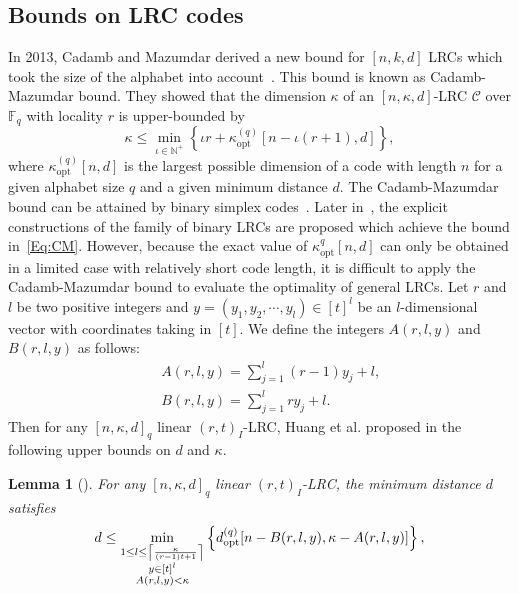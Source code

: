 \documentclass[10pt]{article}
\newtheorem{lemma}{Lemma}
\newcommand{\0}{\textbf{0}}
\newcommand{\1}{\textbf{1}}
\begin{document}
{\color{red}
\subsection{Bounds on LRC codes}

 In 2013,  Cadamb and Mazumdar derived a new bound for $[n,k,d]$ LRCs which took the size of the alphabet into
 account~\cite{Viveck2013}. This bound is known as Cadamb-Mazumdar bound. They showed that the dimension $\kappa$ of
 an $[n, \kappa, d]$-LRC $\mathcal{C}$ over $\mathbb{F}_{q}$ with locality $r$ is upper-bounded by
\begin{equation}\label{Eq:CM}
 \kappa \leq \min _{\iota \in \mathbb{N}^{+}}\left\{\iota r+\kappa_{\text {opt }}^{(q)}[n-\iota(r+1), d]\right\},
\end{equation}
where $\kappa_{\text {opt }}^{(q)}[n, d]$ is the largest possible dimension of a code with length $n$ for a given alphabet size $q$
and a given minimum distance $d$.
The Cadamb-Mazumdar bound can be attained
by binary simplex codes~\cite{Viveck2015}. Later in~\cite{Viveck2013,Natalia2015}, the explicit constructions of
the family of binary LRCs are proposed which achieve the bound in~\eqref{Eq:CM}.  However, because the exact
value of $\kappa^q_{\text {opt}}[n,d]$ can only be obtained in a limited case with relatively short code length, it is difficult to apply
the Cadamb-Mazumdar bound to evaluate the optimality of general LRCs.
Let $r$ and $l$ be two positive integers and $y=\left(y_1, y_2, \cdots, y_l\right) \in [t]^l$ be an $l$-dimensional vector with coordinates taking in $[t]$.
We define the integers $A(r, l, y)$ and $B(r, l, y)$ as follows:
\begin{eqnarray}
&&A(r, l, y)=\sum_{j=1}^l(r-1) y_j+l,\label{eq:A} \\
&&B(r, l, y)=\sum_{j=1}^l r y_j+l.\label{eq:B}
\end{eqnarray}
Then for any $[n, \kappa, d]_q$ linear $(r,t)_I$-LRC,  Huang et al. proposed in \cite{HuangYUSTIT16} the following
upper bounds on $d$ and $\kappa$.
\begin{lemma}[\cite{HuangYUSTIT16}]\label{L:BoundHuang}
For any $[n, \kappa, d]_q$ linear $(r, t)_I$-LRC, the minimum distance $d$ satisfies
\begin{equation}\label{eq:bound-d}
d \leq  \min _{\substack{1\leq l \leq \left\lceil\frac{\kappa}{(r-1)t+1}\right\rceil\\ y \in [t]^{l} \\ A(r, l, y)<\kappa}}\left\{d_{{\rm opt }}^{(q)}[n-B(r, l, y), \kappa-A(r, l, y)]\right\},

\end{equation}
\end{lemma}}
\end{document}
